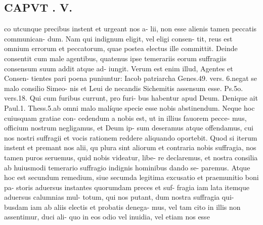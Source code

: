 \documentclass{article}
\begin{document}
\begin{pages}
\section*{CAPVT . V. }
\marginpar{[ p.339 ]}co utcunque precibus instent et urgeant nos a- lii, non esse alienis tamen peccatis communican- dum. Nam qui indignum eligit, vel eligi consen- tit, reus est omnium errorum et peccatorum, quae postea electus ille committit. Deinde consentit cum male agentibus, quatenus ipse temerariis eorum suffragiis consensum suum addit atque ad- iungit. Verum est enim illud, Agentes et Consen- tientes pari poena puniuntur: Iacob patriarcha Genes.49. vers. 6.negat se malo consilio Simeo- nis et Leui de necandis Sichemitis assensum esse. Ps.5o. vers.18. Qui cum furibus currunt, pro furi- bus habentur apud Deum. Denique ait Paul.1. Thess.5.ab omni malo malíque specie esse nobis abstinendum. Neque hoc cuiusquam gratiae con- cedendum a nobis est, ut in illius fauorem pecce- mus, officium nostrum negligamus, et Deum ip- sum deseramus atque offendamus, cui nos nostri suffragii et vocis rationem reddere aliquando oportebit. Quod si iterum instent et premant nos alii, qu plura sint aliorum et contraria nobis suffragia, nos tamen puros seruemus, quid nobis videatur, libe- re declaremus, et nostra consilia ab huiusmodi temerario suffragio indignis hominibus dando se- paremus. Atque hoc est secundum remedium, siue secumda legitima excusatio et praemunitio boni pa- storis aduersus instantes quorumdam preces et suf- fragia iam lata itemque aduersus calumnias mul- totum, qui nos putant, dum nostra suffragia qui- busdam iam ab aliis electis et probatis denega- mus, vel tam cito in illis non assentimur, duci ali- quo in eos odio vel inuidia, vel etiam nos esse 

\end{pages}
\end{document}
